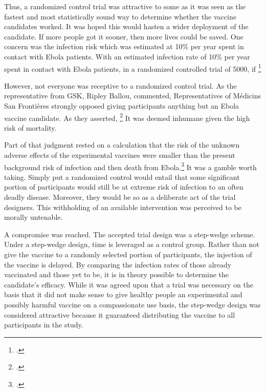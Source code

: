 \documentclass[letterpaper,notitlepage,12pt]{article}
\begin{document}
Thus, a randomized control trial was attractive to some as it was seen as the
fastest and most statistically sound way to determine whether the vaccine
candidates worked.
It was hoped this would hasten a wider deployment of the candidate.
If more people got it sooner, then more lives could be saved.
One concern was the infection risk which was estimated at 10\% per year spent in
contact with Ebola patients.
With an estimated infection rate of 10\% per year spent in contact with Ebola
patients, in a randomized controlled trial of 5000, 
if \footcite{Science}

However, not everyone was receptive to a randomized control trial.
As the representative from GSK, Ripley Ballou, commented, 
Representatives of M\'{e}dicins San Fronti\`{e}res strongly opposed
giving participants anything but an Ebola vaccine candidate.
As they asserted, \footcite{Science}
It was deemed inhumane given the high risk of mortality.

Part of that judgment rested on a calculation that the risk of the unknown
adverse effects of the experimental vaccines were smaller than the present
background risk of infection and then death from Ebola.\footcite[p. 114]{NAP}
It was a gamble worth taking.
Simply put a randomized control would entail that some significant portion of
participants would still be at extreme risk of infection to an often deadly
disease.
Moreover, they would be so as a deliberate act of the trial designers.
This withholding of an available intervention was perceived to be morally
untenable.

A compromise was reached.
The accepted trial design was a step-wedge scheme.
Under a step-wedge design, time is leveraged as a control group.
Rather than not give the vaccine to a randomly selected portion of participants,
the injection of the vaccine is delayed.
By comparing the infection rates of those already vaccinated and those yet to
be, it is in theory possible to determine the candidate's efficacy.
While it was agreed upon that a trial was necessary on the basis that it did not 
make sense to give healthy people an experimental and possibly harmful vaccine on 
a compassionate use basis, the step-wedge design was considered attractive because 
it guaranteed distributing the vaccine to all participants in the study.
\end{document}
